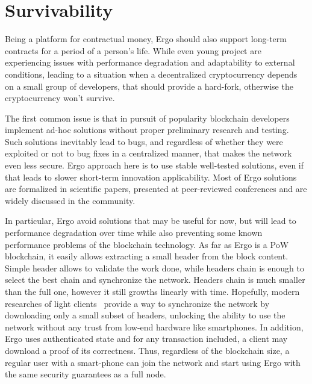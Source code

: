 \section{Survivability}
\label{sec:survivability}


Being a platform for contractual money, Ergo should also support long-term contracts for a
period of a person's life.
While even young project are experiencing issues with performance degradation and
adaptability to external conditions, leading to a situation when a decentralized cryptocurrency
depends on a small group of developers, that should provide a hard-fork, otherwise the cryptocurrency
won't survive.

The first common issue is that in pursuit of popularity blockchain developers implement ad-hoc
solutions without proper preliminary research and testing.
Such solutions inevitably lead to bugs, and regardless of whether they were exploited or not
to bug fixes in a centralized manner, that makes the network even less secure.
Ergo approach here is to use stable well-tested solutions, even if that leads to slower
short-term innovation applicability.
Most of Ergo solutions are formalized in scientific papers, presented at peer-reviewed conferences
and are widely discussed in the community.

In particular, Ergo avoid solutions that may be useful for now, but will lead to performance degradation
over time while also preventing some known performance problems of the blockchain technology.
As far as Ergo is a PoW blockchain, it easily allows extracting a small header from the block content.
Simple header allows to validate the work done, while headers chain is enough to select the best chain
and synchronize the network.
Headers chain is much smaller than the full one, however it still growths linearly with time.
Hopefully, modern researches of light clients~\cite{nipopows, flight clients} provide a way to
synchronize the network by downloading only a small subset of headers, unlocking the ability to
use the network without any trust from low-end hardware like smartphones.
In addition, Ergo uses authenticated state\cite{???} and for any transaction included,
a client may download a proof of its correctness.
Thus, regardless of the blockchain size, a regular user with a
smart-phone can join the network and start using Ergo with the same security
guarantees as a full node.

